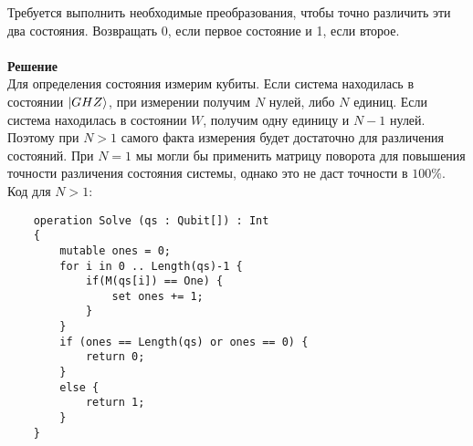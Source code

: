 \documentclass{article}
\begin{document}
Требуется выполнить необходимые преобразования, чтобы точно различить эти два состояния. Возвращать $0$, если первое состояние и 1, если второе.\\\\
\textbf{Решение}\\Для определения состояния измерим кубиты. Если система находилась в состоянии $\ket{GHZ}$, при измерении получим $N$ нулей, либо $N$ единиц. Если система находилась в состоянии $W$, получим одну единицу и $N-1$ нулей. Поэтому при $N > 1$ самого факта измерения будет достаточно для различения состояний. При $N = 1$ мы могли бы применить матрицу поворота для повышения точности различения состояния системы, однако это не даст точности в $100\%$.\\
Код для $N > 1$:
\begin{verbatim}
    operation Solve (qs : Qubit[]) : Int
    {
        mutable ones = 0;
        for i in 0 .. Length(qs)-1 {
            if(M(qs[i]) == One) {
                set ones += 1;
            }
        }
        if (ones == Length(qs) or ones == 0) {
            return 0;
        }
        else {
            return 1;
        }
    }
\end{verbatim}
\end{document}
